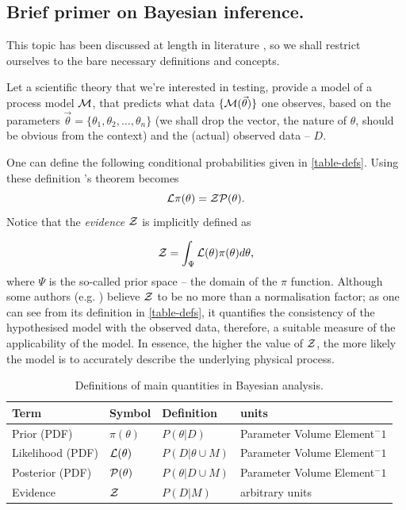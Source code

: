 \documentclass[usenatbib]{mnras}
\begin{document}
\subsection{Brief primer on Bayesian inference.}
\label{sec:org6b58811}

This topic has been discussed at length in literature
\citep{jeffreys2010scientific}, so we shall restrict ourselves to the
bare necessary definitions and concepts.

Let a scientific theory that we're interested in testing, provide a
model of a process model \({\cal M}\), that predicts what data \(\lbrace {\cal M}(\vec{\theta})\rbrace\) one observes, based on the
parameters \(\vec{\theta} = \lbrace \theta_1, \theta_2, \ldots,
   \theta_n \rbrace\) (we shall drop the vector, the nature of
\(\theta\), should be obvious from the context) and the (actual)
observed data -- \(D\).

One can define the following conditional probabilities given
in \autoref{table-defs}. Using these definition \citeauthor{1763} 's theorem
becomes
\begin{equation}
 {\cal L} \pi (\theta) = {\cal Z} {\cal P} (\theta).
\label{eq:bayes} 
\end{equation}
Notice that the \emph{evidence} \({\cal Z}\) is implicitly defined as

\begin{equation}\label{eq:def-z}
 {\cal Z} = \int_{\Psi} {\cal L}(\theta) \pi(\theta) d\theta, 
\end{equation}
where \(\Psi\) is the so-called prior space -- the domain of the
\(\pi\) function. Although some authors
(e.g. \citeauthor{jeffreys2010scientific}) believe \({\cal Z}\) to be
no more than a normalisation factor; as one can see from its
definition in \autoref{table-defs}, it quantifies the consistency of
the hypothesised model with the observed data, therefore, a
suitable measure of the applicability of the model. In essence, the
higher the value of \({\cal Z}\), the more likely the model is to 
accurately describe the underlying physical process.

\begin{table}[htbp]
\caption{Definitions of main quantities in Bayesian analysis. \label{table-defs}}
\centering
\begin{tabular}{llll}
\textbf{\textbf{Term}} & \textbf{\textbf{Symbol}} & \textbf{\textbf{Definition}} & \textbf{\textbf{units}}\\
\hline
Prior (PDF) & \(\pi(\theta)\) & \(P ( \theta  \vert D)\) & Parameter Volume Element\(^-1\)\\
Likelihood (PDF) & \({\cal L}(\theta)\) & \(P ( D \vert \theta \cup M)\) & Parameter Volume Element\(^-1\)\\
Posterior (PDF) & \({\cal P}(\theta)\) & \(P ( \theta \vert D \cup M)\) & Parameter Volume Element\(^-1\)\\
Evidence & \({\cal Z}\) & \(P ( D \vert M)\) & arbitrary units\\
\end{tabular}
\end{table}
\end{document}
